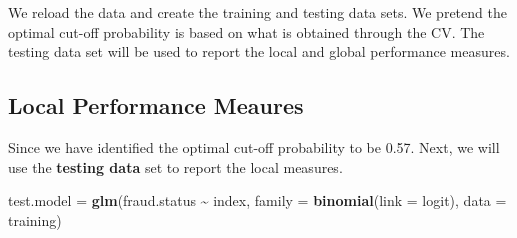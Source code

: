 \documentclass[
]{book}
\newenvironment{Shaded}{\begin{snugshade}}{\end{snugshade}}
\newcommand{\AttributeTok}[1]{\textcolor[rgb]{0.13,0.29,0.53}{#1}}
\newcommand{\ConstantTok}[1]{\textcolor[rgb]{0.56,0.35,0.01}{#1}}
\newcommand{\DecValTok}[1]{\textcolor[rgb]{0.00,0.00,0.81}{#1}}
\newcommand{\DocumentationTok}[1]{\textcolor[rgb]{0.56,0.35,0.01}{\textbf{\textit{#1}}}}
\newcommand{\FloatTok}[1]{\textcolor[rgb]{0.00,0.00,0.81}{#1}}
\newcommand{\FunctionTok}[1]{\textcolor[rgb]{0.13,0.29,0.53}{\textbf{#1}}}
\newcommand{\NormalTok}[1]{#1}
\newcommand{\OtherTok}[1]{\textcolor[rgb]{0.56,0.35,0.01}{#1}}
\newcommand{\SpecialCharTok}[1]{\textcolor[rgb]{0.81,0.36,0.00}{\textbf{#1}}}
\newcommand{\StringTok}[1]{\textcolor[rgb]{0.31,0.60,0.02}{#1}}
\begin{document}
We reload the data and create the training and testing data sets. We pretend the optimal cut-off probability is based on what is obtained through the CV. The testing data set will be used to report the local and global performance measures.

\begin{Shaded}
\end{Shaded}

\hypertarget{local-performance-meaures}{%
\subsection{Local Performance Meaures}\label{local-performance-meaures}}

Since we have identified the optimal cut-off probability to be 0.57. Next, we will use the \textbf{testing data} set to report the local measures.

\begin{Shaded}
\begin{Highlighting}[]
\NormalTok{test.model }\OtherTok{=} \FunctionTok{glm}\NormalTok{(fraud.status }\SpecialCharTok{\textasciitilde{}}\NormalTok{ index, }\AttributeTok{family =} \FunctionTok{binomial}\NormalTok{(}\AttributeTok{link =}\NormalTok{ logit), }\AttributeTok{data =}\NormalTok{ training)}
\end{Highlighting}
\end{Shaded}
\end{document}
